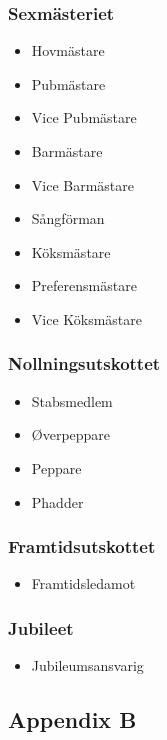\documentclass{dsekprotokoll}
\begin{document}
\begin{multicols}{2}
    \subsubsection*{Sexmästeriet}
    \begin{itemize}
        \item Hovmästare
        \item Pubmästare
        \item Vice Pubmästare
        \item Barmästare
        \item Vice Barmästare
        \item Sångförman
        \item Köksmästare
        \item Preferensmästare
        \item Vice Köksmästare
    \end{itemize}

    \subsubsection*{Nollningsutskottet}
    \begin{itemize}
        \item Stabsmedlem
        \item Øverpeppare
        \item Peppare
        \item Phadder
    \end{itemize}

    \subsubsection*{Framtidsutskottet}
    \begin{itemize}
        \item Framtidsledamot
    \end{itemize}

    \subsubsection*{Jubileet}
    \begin{itemize}
        \item Jubileumsansvarig
    \end{itemize}
\end{multicols}

\pagebreak
\subsection*{Appendix B}
\end{document}
